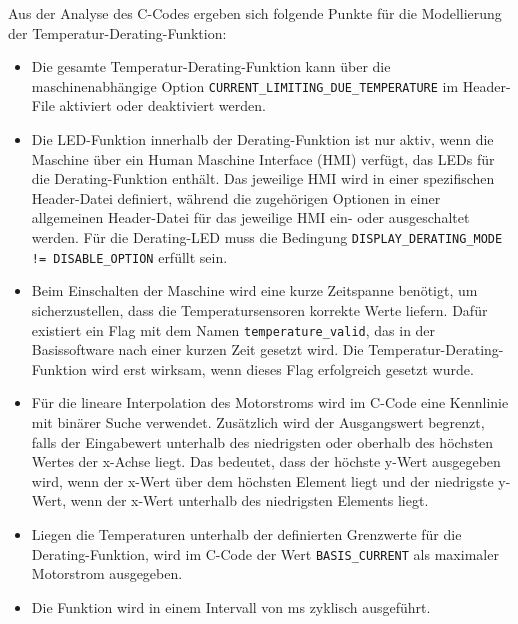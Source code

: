 Aus der Analyse des C-Codes \cite{Firmware_gesamt} ergeben sich folgende Punkte für die Modellierung der Temperatur-Derating-Funktion:
\begin{itemize}
\item Die gesamte Temperatur-Derating-Funktion kann über die maschinenabhängige Option \lstinline{CURRENT_LIMITING_DUE_TEMPERATURE} im Header-File aktiviert oder deaktiviert werden.

\item Die LED-Funktion innerhalb der Derating-Funktion ist nur aktiv, wenn die Maschine über ein Human Maschine Interface (HMI) verfügt, das LEDs für die Derating-Funktion enthält. Das jeweilige HMI wird in einer spezifischen Header-Datei definiert, während die zugehörigen Optionen in einer allgemeinen Header-Datei für das jeweilige HMI ein- oder ausgeschaltet werden. Für die Derating-LED muss die Bedingung \lstinline{DISPLAY_DERATING_MODE != DISABLE_OPTION} erfüllt sein.   

\item Beim Einschalten der Maschine wird eine kurze Zeitspanne benötigt, um sicherzustellen, dass die Temperatursensoren korrekte Werte liefern. Dafür existiert ein Flag mit dem Namen \lstinline{temperature_valid}, das in der Basissoftware nach einer kurzen Zeit gesetzt wird. Die Temperatur-Derating-Funktion wird erst wirksam, wenn dieses Flag erfolgreich gesetzt wurde. 

\item Für die lineare Interpolation des Motorstroms wird im C-Code eine Kennlinie mit binärer Suche verwendet. Zusätzlich wird der Ausgangswert begrenzt, falls der Eingabewert unterhalb des niedrigsten oder oberhalb des höchsten Wertes der x-Achse liegt. Das bedeutet, dass der höchste y-Wert ausgegeben wird, wenn der x-Wert über dem höchsten Element liegt und der niedrigste y-Wert, wenn der x-Wert unterhalb des niedrigsten Elements liegt.

\item Liegen die Temperaturen unterhalb der definierten Grenzwerte für die Derating-Funktion, wird im C-Code der Wert \lstinline{BASIS_CURRENT} als maximaler Motorstrom ausgegeben.

\item Die Funktion wird in einem Intervall von \unit[1]{ms} zyklisch ausgeführt.
\end{itemize}

